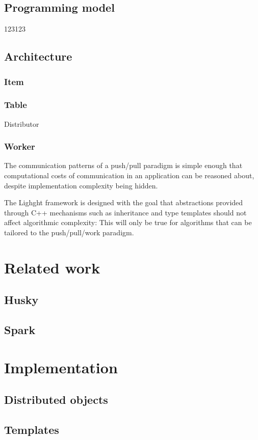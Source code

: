 \documentclass{uit-report}
\begin{document}
\subsection{Programming model}
123123
\subsection{Architecture}
\subsubsection{Item}
\subsubsection{Table}
Distributor
\subsubsection{Worker}


The communication patterns of a push/pull paradigm is simple enough that computational costs of communication in an application can be reasoned about, despite implementation complexity being hidden. 

The Lighght framework is designed with the goal that abstractions provided through C++ mechanisms such as inheritance and type templates should not affect algorithmic complexity: This will only be true for algorithms that can be tailored to the push/pull/work paradigm. 

\newpage
\section{Related work}
\subsection{Husky}
\subsection{Spark}

\newpage
\section{Implementation}
\subsection{Distributed objects}
\subsection{Templates}
\end{document}
